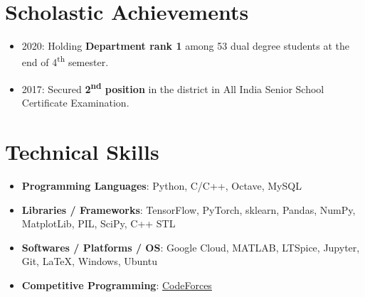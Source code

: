 \documentclass[letterpaper,11pt]{article}
\newcommand{\resumeItem}[2]{
  \item\small{
    \textbf{#1}{: #2 \vspace{-2pt}}
  }
}
\newcommand{\resumeSubItem}[2]{\resumeItem{#1}{#2}\vspace{-4pt}}
\newcommand{\resumeSubHeadingListStart}{\begin{itemize}[leftmargin=*]}
\newcommand{\resumeSubHeadingListEnd}{\end{itemize}}
\begin{document}
\section{Scholastic Achievements}
  \resumeSubHeadingListStart
      \itemsep-0.5em
      \item{2020: Holding \textbf{Department rank 1} among 53 dual degree students at the end of 4\textsuperscript{th} semester.}
      \item{2017: Secured \textbf{2\textsuperscript{nd} position} in the district in All India Senior School Certificate Examination.}
      
  \resumeSubHeadingListEnd
\section{Technical Skills}
  \resumeSubHeadingListStart
    \resumeSubItem{Programming Languages}
      {Python, C/C++, Octave, MySQL}
    \resumeSubItem{Libraries / Frameworks}
      {TensorFlow, PyTorch, sklearn, Pandas, NumPy, MatplotLib, PIL, SciPy, C++ STL}
    \resumeSubItem{Softwares / Platforms / OS}
      {Google Cloud, MATLAB, LTSpice, Jupyter, Git, \LaTeX, Windows, Ubuntu}
    \resumeSubItem{Competitive Programming}
      {\href{https://codeforces.com/profile/QMark}{CodeForces}}
  \resumeSubHeadingListEnd
  
\end{document}
